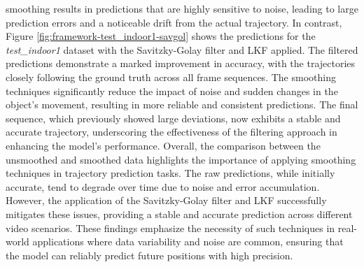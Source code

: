 \documentclass[12pt,oneside]{book} %
\begin{document}
smoothing results in predictions that are highly sensitive to noise, leading to
large prediction errors and a noticeable drift from the actual trajectory. In
contrast, Figure \ref{fig:framework-test_indoor1-savgol} shows the predictions
for the \textit{test\_indoor1} dataset with the Savitzky-Golay filter and LKF
applied. The filtered predictions demonstrate a marked improvement in accuracy,
with the trajectories closely following the ground truth across all frame
sequences. The smoothing techniques significantly reduce the impact of noise
and sudden changes in the object's movement, resulting in more reliable and
consistent predictions. The final sequence, which previously showed large
deviations, now exhibits a stable and accurate trajectory, underscoring the
effectiveness of the filtering approach in enhancing the model's performance.
Overall, the comparison between the unsmoothed and smoothed data highlights the
importance of applying smoothing techniques in trajectory prediction tasks. The
raw predictions, while initially accurate, tend to degrade over time due to
noise and error accumulation. However, the application of the Savitzky-Golay
filter and LKF successfully mitigates these issues, providing a stable and
accurate prediction across different video scenarios. These findings emphasize
the necessity of such techniques in real-world applications where data
variability and noise are common, ensuring that the model can reliably predict
future positions with high precision.
\end{document}
